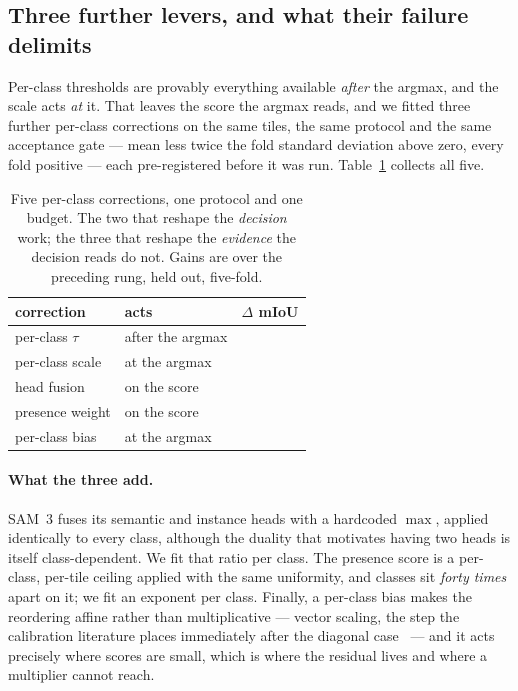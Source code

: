 \documentclass[10pt,a4paper]{article}                        %
\newcommand{\best}[1]{\textbf{#1}}
\begin{document}
\subsection{Three further levers, and what their failure delimits}
\label{sec:levers}

Per-class thresholds are provably everything available \emph{after} the argmax,
and the scale acts \emph{at} it. That leaves the score the argmax reads, and we
fitted three further per-class corrections on the same tiles, the same protocol
and the same acceptance gate --- mean less twice the fold standard deviation above
zero, every fold positive --- each pre-registered before it was run.
Table~\ref{tab:fivelevers} collects all five.

\begin{table}[t]
\centering
\caption{Five per-class corrections, one protocol and one budget. The two that
reshape the \emph{decision} work; the three that reshape the \emph{evidence} the
decision reads do not. Gains are over the preceding rung, held out, five-fold.}
\label{tab:fivelevers}
\small
\begin{tabular}{llr}
\toprule
correction & acts & $\Delta$ mIoU \\
\midrule
per-class $\tau$        & after the argmax  & \best{\methodGain{}} \\
per-class scale         & at the argmax     & \best{\scLove{}} \\
\midrule
head fusion             & on the score      & \lvThreeLove{} \\
presence weight         & on the score      & \lvFour{} \\
per-class bias          & at the argmax     & \lvFive{} \\
\bottomrule
\end{tabular}
\end{table}

\paragraph{What the three add.} SAM~3 fuses its semantic and instance heads with a
hardcoded $\max$, applied identically to every class, although the duality that
motivates having two heads is itself class-dependent. We fit that ratio per class.
The presence score is a per-class, per-tile ceiling applied with the same
uniformity, and classes sit \emph{forty times} apart on it; we fit an exponent per
class. Finally, a per-class bias makes the reordering affine rather than
multiplicative --- vector scaling, the step the calibration literature places
immediately after the diagonal case~\cite{guo2017,kull2019} --- and it acts
precisely where scores are small, which is where the residual lives and where a
multiplier cannot reach.
\end{document}

